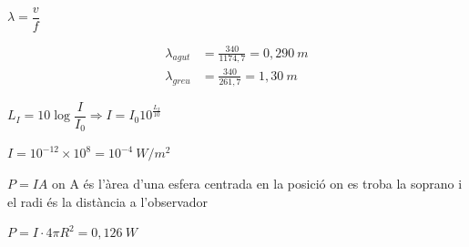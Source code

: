 \begin{solapartat}
 $\lambda = \dfrac{v}{f}$

\begin{align*}
\lambda_{\mathit{agut}} &= \frac{340}{1174,7} = 0,290\ m\\
\lambda_{\mathit{greu}} &= \frac{340}{261,7} = 1,30\ m
\end{align*}
\end{solapartat}

\begin{solapartat}
 $L_I = 10\log\dfrac{I}{I_0} \Rightarrow I = I_0 10^{\frac{L_I}{10}}$

 $I = 10^{-12}\times 10^{8} = 10^{-4}\ W/m^2$

 $P = IA$ on A és l'àrea d'una esfera centrada en la posició on es troba la soprano i el radi és la distància a l'observador

 $P = I\cdot 4\pi R^2 = 0,126\ W$
\end{solapartat}
